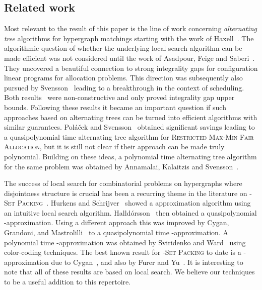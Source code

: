 \documentclass[11pt]{article}
\theoremstyle{definition}
\theoremstyle{remark}
\newcommand{\problemmacro}[1]{\texorpdfstring{\textsc{#1}}{#1}\xspace}
\begin{document}
\subsection{Related work}
Most relevant to the result of this paper is the line of work
concerning \emph{alternating tree} algorithms for hypergraph matchings
starting with the work of Haxell~\cite{haxell1995condition}. The
algorithmic question of whether the underlying local search algorithm
can be made efficient was not considered until the work of Asadpour,
Feige and Saberi~\cite{asadpour2012santa}. They uncovered a beautiful
connection to strong integrality gaps for configuration linear
programs for allocation problems. This direction was subsequently also
pursued by Svensson~\cite{svensson2012santa} leading to a
breakthrough in the context of scheduling. Both
results~\cite{asadpour2012santa,svensson2012santa} were
non-constructive and only proved integrality gap upper
bounds. Following these results it became an important question if
such approaches based on alternating trees can be turned into
efficient algorithms with similar guarantees. Pol\'a\v{c}ek and
Svensson~\cite{polacek2012quasi} obtained significant savings leading
to a quasipolynomial time alternating tree algorithm for
\problemmacro{Restricted Max-Min Fair Allocation}, but it is still not
clear if their approach can be made truly polynomial. Building on
these ideas, a polynomial time alternating tree algorithm for the same
problem was obtained by Annamalai, Kalaitzis and
Svensson~\cite{DBLP:conf/soda/AnnamalaiKS15}.

The success of local search for combinatorial problems on hypergraphs
where disjointness structure is crucial has been a recurring theme in
the literature on \problemmacro{-Set
  Packing}~\cite{karp1972reducibility}. Hurkens and
Schrijver~\cite{hurkens1989size} showed a 
approximation algorithm using an intuitive local search
algorithm. Halld\'orsson~\cite{halldorsson1995approximating} then
obtained a quasipolynomial -approximation. Using a different
approach this was improved by Cygan, Grandoni, and
Mastrolilli~\cite{cygan2013sell} to a quasipolynomial time
-approximation. A polynomial time
-approximation was obtained by Sviridenko and
Ward~\cite{sviridenko2013large} using color-coding techniques. The
best known result for \problemmacro{-Set Packing} to date is a
-approximation due to
Cygan~\cite{cygan2013improved}, and also by Furer and
Yu~\cite{furer2014approximating}. It is interesting to note that all
of these results are based on local search. We believe our techniques
to be a useful addition to this repertoire.
\end{document}
